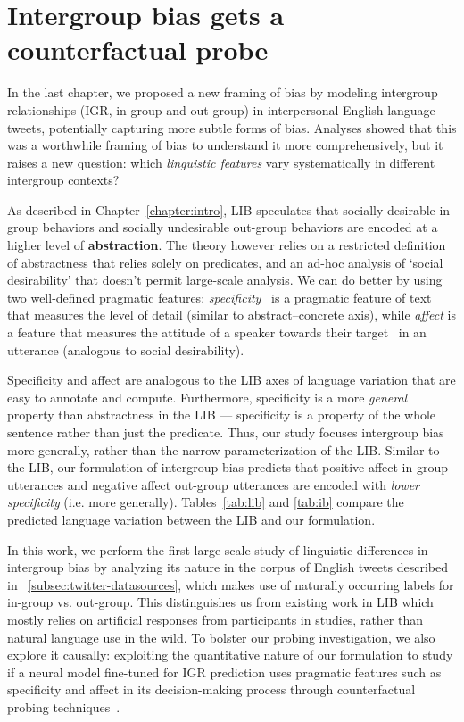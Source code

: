 \chapter{Intergroup bias gets a counterfactual probe}
\label{chapter:probing}

In the last chapter, we proposed a new framing of bias by modeling intergroup relationships (IGR, in-group and out-group) in interpersonal English language tweets, potentially capturing more subtle forms of bias. Analyses showed that this was a worthwhile framing of bias to understand it more comprehensively, but it raises a new question: which \emph{linguistic features} vary systematically in different intergroup contexts?

As described in Chapter~\ref{chapter:intro}, LIB speculates that socially desirable in-group behaviors and socially undesirable out-group behaviors are encoded at a higher level of \textbf{abstraction}. The theory however relies on a restricted definition of abstractness that relies solely on predicates, and an ad-hoc analysis of `social desirability' that doesn't permit large-scale analysis. We can do better by using two well-defined pragmatic features: \emph{specificity}~\citep{li_discourse_2017} is a pragmatic feature of text that measures the level of detail (similar to abstract--concrete axis), while \emph{affect} is a feature that measures the attitude of a speaker towards their target~\citep{sheng-etal-2019-woman} in an utterance (analogous to social desirability).

Specificity and affect are analogous to the LIB axes of language variation that are easy to annotate and compute. Furthermore, specificity is a more \emph{general} property than abstractness in the LIB --- specificity is a property of the whole sentence rather than just the predicate. Thus, our study focuses intergroup bias more generally, rather than the narrow parameterization of the LIB. Similar to the LIB, our formulation of intergroup bias predicts that positive affect in-group utterances and negative affect out-group utterances are encoded with \emph{lower specificity} (i.e. more generally). Tables~\ref{tab:lib} and \ref{tab:ib} compare the predicted language variation between the LIB and our formulation. 

In this work, we perform the first large-scale study of linguistic differences in intergroup bias by analyzing its nature in the corpus of English tweets described in \textsection~\ref{subsec:twitter-datasources}, which makes use of naturally occurring labels for in-group vs. out-group. This distinguishes us from existing work in LIB which mostly relies on artificial responses from participants in studies, rather than natural language use in the wild. To bolster our probing investigation, we also explore it causally: exploiting the quantitative nature of our formulation to study if a neural model fine-tuned for IGR prediction uses pragmatic features such as specificity and affect in its decision-making process through counterfactual probing techniques~\citep{ravfogel-etal-2021-counterfactual}.

